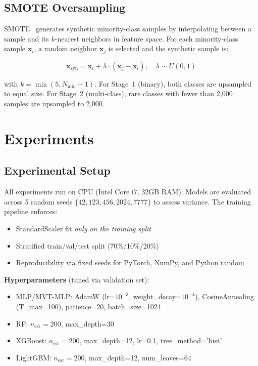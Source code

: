 \documentclass[12pt]{article}
\begin{document}
\subsection{SMOTE Oversampling}
\label{subsec:smote}

SMOTE~\cite{chawla2002smote} generates synthetic minority-class samples by interpolating between a sample and its $k$-nearest neighbors in feature space. For each minority-class sample $\mathbf{x}_i$, a random neighbor $\mathbf{x}_j$ is selected and the synthetic sample is:

\begin{equation}
    \mathbf{x}_{\text{syn}} = \mathbf{x}_i + \lambda \cdot (\mathbf{x}_j - \mathbf{x}_i), \quad \lambda \sim U(0, 1)
\end{equation}

\noindent with $k = \min(5, N_{\min} - 1)$. For Stage~1 (binary), both classes are upsampled to equal size. For Stage~2 (multi-class), rare classes with fewer than 2,000 samples are upsampled to 2,000.

\section{Experiments}
\label{sec:experiments}

\subsection{Experimental Setup}
\label{subsec:setup}

All experiments run on CPU (Intel Core i7, 32GB RAM). Models are evaluated across 5 random seeds $\{42, 123, 456, 2024, 7777\}$ to assess variance. The training pipeline enforces:
\begin{itemize}
    \item StandardScaler fit \emph{only on the training split}
    \item Stratified train/val/test split (70\%/10\%/20\%)
    \item Reproducibility via fixed seeds for PyTorch, NumPy, and Python random
\end{itemize}

\textbf{Hyperparameters} (tuned via validation set):
\begin{itemize}
    \item MLP/MVT-MLP: AdamW (lr=$10^{-3}$, weight\_decay=$10^{-4}$), CosineAnnealing (T\_max=100), patience=20, batch\_size=1024
    \item RF: $n_{\text{est}}=200$, max\_depth=30
    \item XGBoost: $n_{\text{est}}=200$, max\_depth=12, lr=0.1, tree\_method='hist'
    \item LightGBM: $n_{\text{est}}=200$, max\_depth=12, num\_leaves=64
\end{itemize}
\end{document}
